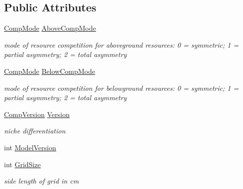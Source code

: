 \subsection*{Public Attributes}
\begin{DoxyCompactItemize}
\item 
\mbox{\label{struct_s_run_para_acf1525d16d8ef494371eeedd5633cfdd}} 
\mbox{\hyperlink{_run_para_8h_ab256e359929ebfa9774c7b73de3101cf}{Comp\+Mode}} \mbox{\hyperlink{struct_s_run_para_acf1525d16d8ef494371eeedd5633cfdd}{Above\+Comp\+Mode}}
\begin{DoxyCompactList}\small\item\em mode of resource competition for aboveground resources\+: 0 = symmetric; 1 = partial asymmetry; 2 = total asymmetry \end{DoxyCompactList}\item 
\mbox{\label{struct_s_run_para_a9faef9be652ad7554a01e95744682394}} 
\mbox{\hyperlink{_run_para_8h_ab256e359929ebfa9774c7b73de3101cf}{Comp\+Mode}} \mbox{\hyperlink{struct_s_run_para_a9faef9be652ad7554a01e95744682394}{Below\+Comp\+Mode}}
\begin{DoxyCompactList}\small\item\em mode of resource competition for belowground resources\+: 0 = symmetric; 1 = partial asymmetry; 2 = total asymmetry \end{DoxyCompactList}\item 
\mbox{\hyperlink{_run_para_8h_aab4f91abfa6a0969e1cae8d7666e4d3a}{Comp\+Version}} \mbox{\hyperlink{struct_s_run_para_a7958c75a9866d1ec4ce0230e3940363b}{Version}}
\begin{DoxyCompactList}\small\item\em niche differentiation \end{DoxyCompactList}\item 
int \mbox{\hyperlink{struct_s_run_para_a7a2de3ca3c66de322585506a367a4aa3}{Model\+Version}}
\item 
\mbox{\label{struct_s_run_para_a45f783f391506297b8e8912a83e302ac}} 
int \mbox{\hyperlink{struct_s_run_para_a45f783f391506297b8e8912a83e302ac}{Grid\+Size}}
\begin{DoxyCompactList}\small\item\em side length of grid in cm \end{DoxyCompactList}\item 

\end{DoxyCompactItemize}
